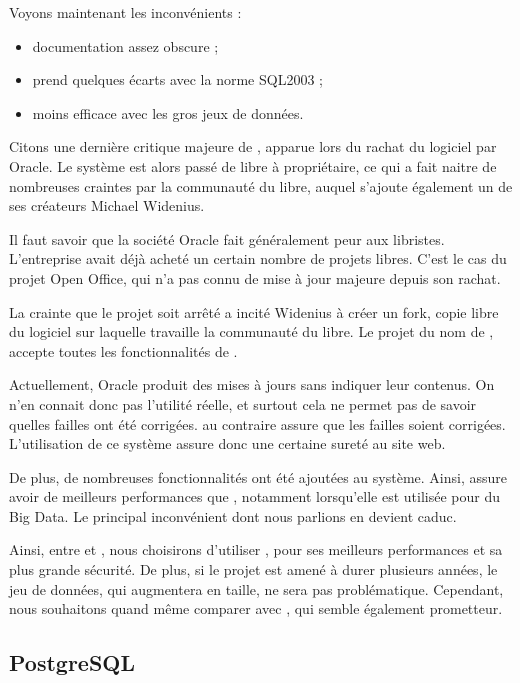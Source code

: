 Voyons maintenant les inconvénients :

\begin{itemize}
\item documentation assez obscure ;
\item prend quelques écarts avec la norme SQL2003 ;
\item moins efficace avec les gros jeux de données. 
\end{itemize} 

Citons une dernière critique majeure de \mysql, apparue lors du rachat du logiciel par Oracle. Le système est alors  passé de libre à propriétaire, ce qui  a fait naitre de nombreuses craintes par la communauté du libre, auquel s'ajoute également un de ses créateurs Michael Widenius. 

Il faut savoir que la société Oracle fait généralement peur aux libristes. L'entreprise avait déjà acheté un certain nombre de projets libres. C'est le cas du projet Open Office, qui n'a pas connu de mise à jour majeure depuis son rachat. 

La crainte que le projet soit arrêté a incité Widenius à créer un fork, copie libre du logiciel sur laquelle travaille la communauté du libre. Le projet du nom de \mdb, accepte toutes les fonctionnalités  de \mysql. 

Actuellement, Oracle produit des mises à jours sans indiquer leur contenus. On n'en connait donc pas l'utilité réelle, et surtout cela ne permet pas de savoir quelles failles ont été corrigées. \mdb au contraire assure que les failles soient corrigées. L'utilisation de ce système assure donc une certaine sureté au site web. 

De plus, de nombreuses fonctionnalités ont été ajoutées au système. Ainsi, \mdb assure avoir de meilleurs performances que \mysql, notamment lorsqu'elle est utilisée pour du Big Data. Le principal inconvénient dont nous parlions en devient caduc. 

\medbreak

Ainsi, entre \mysql et \mdb, nous choisirons d'utiliser \mdb, pour ses meilleurs performances et sa plus grande sécurité. De plus, si le projet est amené à durer plusieurs années, le jeu de données, qui augmentera en taille, ne sera pas problématique. Cependant, nous souhaitons quand même comparer \mdb avec \psql, qui semble également prometteur. 


\subsection{PostgreSQL}

